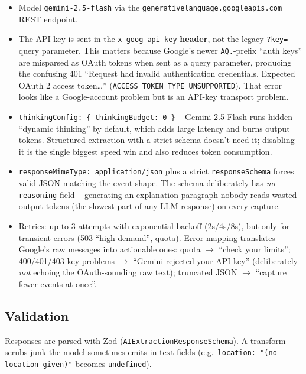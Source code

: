 \documentclass[11pt]{article}
\begin{document}
\begin{itemize}
  \item Model \texttt{gemini-2.5-flash} via the
        \texttt{generativelanguage.googleapis.com} REST endpoint.
  \item The API key is sent in the \texttt{x-goog-api-key} \textbf{header},
        not the legacy \texttt{?key=} query parameter. This matters because
        Google's newer \texttt{AQ.}-prefix ``auth keys'' are misparsed as
        OAuth tokens when sent as a query parameter, producing the confusing
        401 ``Request had invalid authentication credentials. Expected OAuth
        2 access token\ldots'' (\texttt{ACCESS\_TOKEN\_TYPE\_UNSUPPORTED}).
        That error looks like a Google-account problem but is an API-key
        transport problem.
  \item \texttt{thinkingConfig: \{ thinkingBudget: 0 \}} -- Gemini 2.5 Flash
        runs hidden ``dynamic thinking'' by default, which adds large latency
        and burns output tokens. Structured extraction with a strict schema
        doesn't need it; disabling it is the single biggest speed win and
        also reduces token consumption.
  \item \texttt{responseMimeType: application/json} plus a strict
        \texttt{responseSchema} forces valid JSON matching the event shape.
        The schema deliberately has \emph{no} \texttt{reasoning} field --
        generating an explanation paragraph nobody reads wasted output tokens
        (the slowest part of any LLM response) on every capture.
  \item Retries: up to 3 attempts with exponential backoff (2s/4s/8s), but
        only for transient errors (503 ``high demand'', quota). Error
        mapping translates Google's raw messages into actionable ones:
        quota $\rightarrow$ ``check your limits''; 400/401/403 key problems
        $\rightarrow$ ``Gemini rejected your API key'' (deliberately
        \emph{not} echoing the OAuth-sounding raw text); truncated JSON
        $\rightarrow$ ``capture fewer events at once''.
\end{itemize}

\subsection{Validation}

Responses are parsed with Zod (\texttt{AIExtractionResponseSchema}). A
transform scrubs junk the model sometimes emits in text fields (e.g.\
\texttt{location: "(no location given)"} becomes \texttt{undefined}).
\end{document}

